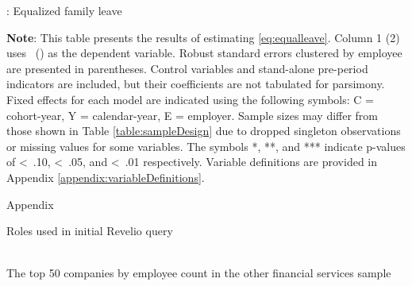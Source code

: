 \documentclass[11pt]{article}
\begin{document}
\clearpage
\begin{table}[!htbp]
    \begin{threeparttable}[b]
        
        \captionsetup{labelfont=bf, singlelinecheck=off, justification=raggedright, labelsep=none}
        \caption{: Equalized family leave}  
        
        \raggedright
        \hspace*{-\leftmargin}
        \vspace*{-0.75cm}
        \normalsize
        
        \noindent
        
        
        \begin{tablenotes}
            \footnotesize
            \item \textbf{Note}: This table presents the results of estimating \ref{eq:equalleave}. Column 1 (2) uses \RETAINED\ (\PROMOTED) as the dependent variable. Robust standard errors clustered by employee are presented in parentheses. Control variables and stand-alone pre-period indicators are included, but their coefficients are not tabulated for parsimony. Fixed effects for each model are indicated using the following symbols: C = cohort-year, Y = calendar-year, E = employer. Sample sizes may differ from those shown in Table \ref{table:sampleDesign} due to dropped singleton observations or missing values for some variables. The symbols *, **, and *** indicate p-values of \textless\, .10, \textless\, .05, and \textless\, .01 respectively. Variable definitions are provided in Appendix \ref{appendix:variableDefinitions}. 
        \end{tablenotes}
        \label{table:eqFamModels}
    \end{threeparttable}
\end{table}



\appendix

\renewcommand{\tablename}{Table} 
\renewcommand{\thetable}{A\arabic{table}} 
\setcounter{table}{0}

\clearpage
\Large
Appendix
\small

\singlespacing

\begin{table}[h!]
    \centering
    \caption{Roles used in initial Revelio query}
    
    \label{table:rolesTable}
\end{table}

\clearpage
\begin{table}[h!]
    \centering
    \caption{\\The top 50 companies by employee count in the other financial services sample}
    
    \label{table:employerTable}
\end{table}

\clearpage
\centering
 
\label{table:variableDefinitions} 
\end{document}
